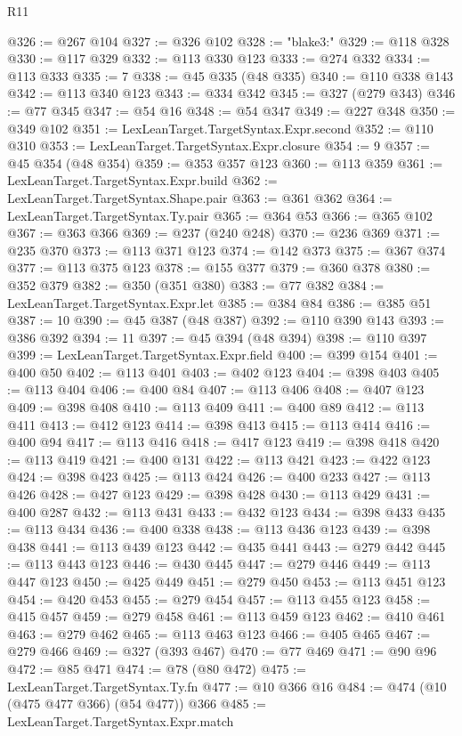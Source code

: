 \begin{lexlean}{R11}
\begin{coremodule}
@326 := @267 @104
@327 := @326 @102
@328 := "blake3:"
@329 := @118 @328
@330 := @117 @329
@332 := @113 @330 @123
@333 := @274 @332
@334 := @113 @333
@335 := 7
@338 := @45 @335 (@48 @335)
@340 := @110 @338 @143
@342 := @113 @340 @123
@343 := @334 @342
@345 := @327 (@279 @343)
@346 := @77 @345
@347 := @54 @16
@348 := @54 @347
@349 := @227 @348
@350 := @349 @102
@351 := LexLeanTarget.TargetSyntax.Expr.second
@352 := @110 @310
@353 := LexLeanTarget.TargetSyntax.Expr.closure
@354 := 9
@357 := @45 @354 (@48 @354)
@359 := @353 @357 @123
@360 := @113 @359
@361 := LexLeanTarget.TargetSyntax.Expr.build
@362 := LexLeanTarget.TargetSyntax.Shape.pair
@363 := @361 @362
@364 := LexLeanTarget.TargetSyntax.Ty.pair
@365 := @364 @53
@366 := @365 @102
@367 := @363 @366
@369 := @237 (@240 @248)
@370 := @236 @369
@371 := @235 @370
@373 := @113 @371 @123
@374 := @142 @373
@375 := @367 @374
@377 := @113 @375 @123
@378 := @155 @377
@379 := @360 @378
@380 := @352 @379
@382 := @350 (@351 @380)
@383 := @77 @382
@384 := LexLeanTarget.TargetSyntax.Expr.let
@385 := @384 @84
@386 := @385 @51
@387 := 10
@390 := @45 @387 (@48 @387)
@392 := @110 @390 @143
@393 := @386 @392
@394 := 11
@397 := @45 @394 (@48 @394)
@398 := @110 @397
@399 := LexLeanTarget.TargetSyntax.Expr.field
@400 := @399 @154
@401 := @400 @50
@402 := @113 @401
@403 := @402 @123
@404 := @398 @403
@405 := @113 @404
@406 := @400 @84
@407 := @113 @406
@408 := @407 @123
@409 := @398 @408
@410 := @113 @409
@411 := @400 @89
@412 := @113 @411
@413 := @412 @123
@414 := @398 @413
@415 := @113 @414
@416 := @400 @94
@417 := @113 @416
@418 := @417 @123
@419 := @398 @418
@420 := @113 @419
@421 := @400 @131
@422 := @113 @421
@423 := @422 @123
@424 := @398 @423
@425 := @113 @424
@426 := @400 @233
@427 := @113 @426
@428 := @427 @123
@429 := @398 @428
@430 := @113 @429
@431 := @400 @287
@432 := @113 @431
@433 := @432 @123
@434 := @398 @433
@435 := @113 @434
@436 := @400 @338
@438 := @113 @436 @123
@439 := @398 @438
@441 := @113 @439 @123
@442 := @435 @441
@443 := @279 @442
@445 := @113 @443 @123
@446 := @430 @445
@447 := @279 @446
@449 := @113 @447 @123
@450 := @425 @449
@451 := @279 @450
@453 := @113 @451 @123
@454 := @420 @453
@455 := @279 @454
@457 := @113 @455 @123
@458 := @415 @457
@459 := @279 @458
@461 := @113 @459 @123
@462 := @410 @461
@463 := @279 @462
@465 := @113 @463 @123
@466 := @405 @465
@467 := @279 @466
@469 := @327 (@393 @467)
@470 := @77 @469
@471 := @90 @96
@472 := @85 @471
@474 := @78 (@80 @472)
@475 := LexLeanTarget.TargetSyntax.Ty.fn
@477 := @10 @366 @16
@484 := @474 (@10 (@475 @477 @366) (@54 @477)) @366
@485 := LexLeanTarget.TargetSyntax.Expr.match

\end{coremodule}
\end{lexlean}
